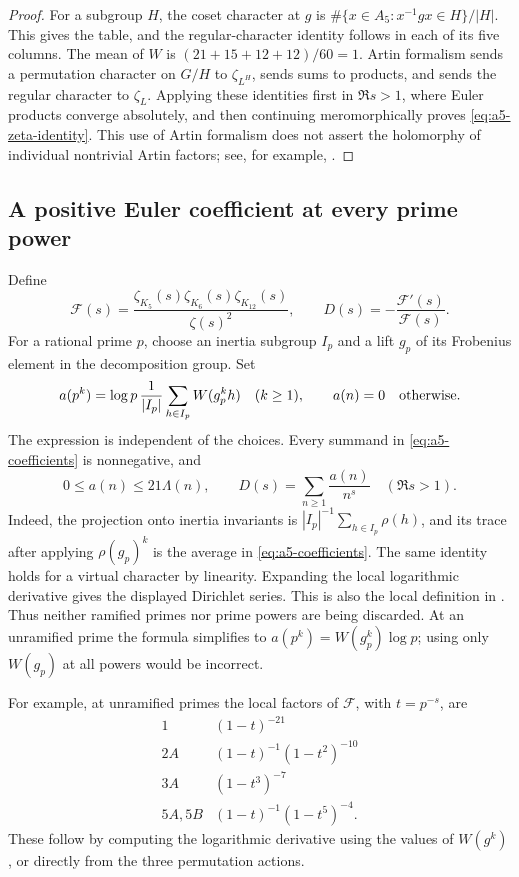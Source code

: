 \begin{proof}
For a subgroup $H$, the coset character at $g$ is
$\#\{x\in A_5:x^{-1}gx\in H\}/|H|$.  This gives the table, and the
regular-character identity follows in each of its five columns.  The mean of
$W$ is $(21+15+12+12)/60=1$.  Artin formalism sends a permutation character on
$G/H$ to $\zeta_{L^H}$, sends sums to products, and sends the regular character
to $\zeta_L$.  Applying these identities first in $\Re s>1$, where Euler
products converge absolutely, and then continuing meromorphically proves
\eqref{eq:a5-zeta-identity}.  This use of Artin formalism does not assert the
holomorphy of individual nontrivial Artin factors; see, for example,
\cite{gun-hazra-sahu,ltz2024}.
\end{proof}

\subsection{A positive Euler coefficient at every prime power}

Define
\begin{equation}
 \mathcal F(s)=
 \frac{\zeta_{K_5}(s)\zeta_{K_6}(s)\zeta_{K_{12}}(s)}{\zeta(s)^2},
 \qquad
 D(s)=-\frac{\mathcal F'(s)}{\mathcal F(s)}.
 \label{eq:a5-detector-function}
\end{equation}
For a rational prime $p$, choose an inertia subgroup $I_p$ and a lift $g_p$
of its Frobenius element in the decomposition group.  Set
\begin{equation}
 a(p^k)=\log p\,\frac1{|I_p|}\sum_{h\in I_p}W(g_p^k h)
 \quad(k\geq1),
 \qquad a(n)=0\quad\hbox{otherwise}.
 \label{eq:a5-coefficients}
\end{equation}
The expression is independent of the choices.  Every summand in
\eqref{eq:a5-coefficients} is nonnegative, and
\[
 0\leq a(n)\leq21\Lambda(n),\qquad
 D(s)=\sum_{n\geq1}\frac{a(n)}{n^s}\quad(\Re s>1).
\]
Indeed, the projection onto inertia invariants is
$|I_p|^{-1}\sum_{h\in I_p}\rho(h)$, and its trace after applying
$\rho(g_p)^k$ is the average in \eqref{eq:a5-coefficients}.  The same identity
holds for a virtual character by linearity.  Expanding the local logarithmic
derivative gives the displayed Dirichlet series.  This is also the local
definition in \cite{gun-hazra-sahu}.  Thus neither ramified primes nor prime
powers are being discarded.  At an unramified prime the formula simplifies to
$a(p^k)=W(g_p^k)\log p$; using only $W(g_p)$ at all powers would be incorrect.

For example, at unramified primes the local factors of $\mathcal F$, with
$t=p^{-s}$, are
\[
\begin{array}{c|c}
1&(1-t)^{-21}\\
2A&(1-t)^{-1}(1-t^2)^{-10}\\
3A&(1-t^3)^{-7}\\
5A,5B&(1-t)^{-1}(1-t^5)^{-4}.
\end{array}
\]
These follow by computing the logarithmic derivative using the values of
$W(g^k)$, or directly from the three permutation actions.

